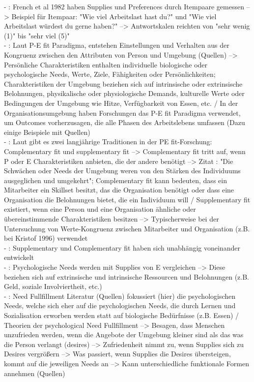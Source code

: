 - \cite[S. 5]{edwards:1993}: French et al 1982 haben Supplies und Preferences durch Itempaare gemessen --> Beispiel für Itempaar: "Wie viel Arbeitslast hast du?" und "Wie viel Arbeitslast würdest du gerne haben?" --> Antwortskalen reichten von "sehr wenig (1)" bis "sehr viel (5)" \\
- \cite[S. 1]{edwards:2004}: Laut P-E fit Paradigma, entstehen Einstellungen und Verhalten aus der Kongruenz zwischen den Attributen von Person und Umgebung (Quellen) --> Persönliche Charakteristiken enthalten individuelle biologische oder psychologische Needs, Werte, Ziele, Fähigkeiten oder Persönlichkeiten; Charakteristiken der Umgebung beziehen sich auf intrinsische oder extrinsische Belohnungen, physikalische oder physiologische Demands, kulturelle Werte oder Bedingungen der Umgebung wie Hitze, Verfügbarkeit von Essen, etc. / In der Organisationsumgebung haben Forschungen das P-E fit Paradigma verwendet, um Outcomes vorherzusagen, die alle Phasen des Arbeitslebens umfassen (Dazu einige Beispiele mit Quellen) \\
- \cite[S. 1]{edwards:2004}: Laut \textcite{muchinsky:1987} gibt es zwei langjährige Traditionen in der PE fit-Forschung: Complementary fit und supplementary fit --> Complementary fit tritt auf, wenn P oder E Charakteristiken anbieten, die der andere benötigt --> Zitat \cite{muchinsky:1987}: "Die Schwächen oder Needs der Umgebung weren von den Stärken des Individuums ausgeglichen und umgekehrt"; Complementary fit kann bedeuten, dass ein Mitarbeiter ein Skillset besitzt, das die Organisation benötigt oder dass eine Organisation die Belohnungen bietet, die ein Individuum will / Supplementary fit existiert, wenn eine Person und eine Organisation ähnliche oder übereinstimmende Charakteristiken besitzen --> Typischerweise bei der Untersuchung von Werte-Kongruenz zwischen Mitarbeiter und Organisation (z.B. bei Kristof 1996) verwendet \\
- \cite[S. 1]{edwards:2004}: Supplementary und Complementary fit haben sich unabhängig voneinander entwickelt \\
- \cite[S. 2]{edwards:2004}: Psychologische Needs werden mit Supplies von E vergleichen --> Diese beziehen sich auf extrinsische und intrinsische Ressourcen und Belohnungen (z.B. Geld, soziale Involviertheit, etc.) \\
- \cite[S. 2]{edwards:2004}: Need Fullfillment Literatur (Quellen) fokussiert (hier) die psychologischen Needs, welche sich eher auf die psychologischen Needs, die durch Lernen und Sozialisation erworben werden statt auf biologische Bedürfnisse (z.B. Essen) / Theorien der psychological Need Fullfillment --> Besagen, dass Menschen unzufrieden werden, wenn die Angebote der Umgebung kleiner sind als das was die Person verlangt (desires) --> Zufriedenheit nimmt zu, wenn Supplies sich zu Desires vergrößern --> Was passiert, wenn Supplies die Desires übersteigen, kommt auf die jeweiligen Needs an --> Kann unterschiedliche funktionale Formen annehmen (Quellen)\\
